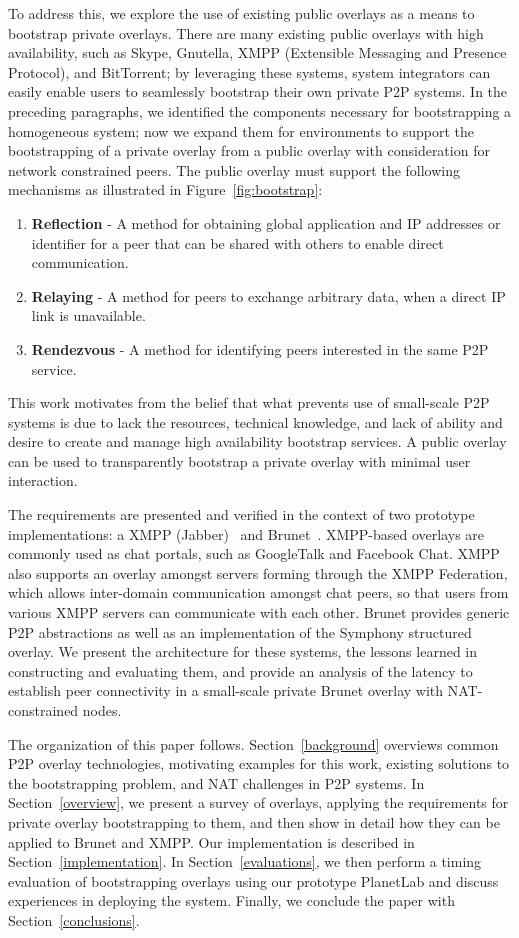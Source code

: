 \documentclass[conference]{IEEEtran}
\begin{document}
To address this, we explore the use of existing public overlays as a means to
bootstrap private overlays.  There are many existing public overlays with high
availability, such as Skype, Gnutella, XMPP (Extensible Messaging and Presence
Protocol), and BitTorrent; by leveraging these systems, system integrators can
easily enable users to seamlessly bootstrap their own private P2P systems.  In
the preceding paragraphs, we identified the components necessary for
bootstrapping a homogeneous system; now we expand them for environments to
support the bootstrapping of a private overlay from a public overlay with
consideration for network constrained peers.  The public overlay must support
the following mechanisms as illustrated in Figure~\ref{fig:bootstrap}:
\begin{enumerate}
\item \textbf{Reflection} - A method for obtaining global application and
IP addresses or identifier for a peer that can be shared with others to enable
direct communication.
\item \textbf{Relaying} - A method for peers to exchange arbitrary data, when
a direct IP link is unavailable.
\item \textbf{Rendezvous} - A method for identifying peers interested in the
same P2P service.
\end{enumerate}
This work motivates from the belief that what prevents use of small-scale P2P
systems is due to lack the resources, technical knowledge, and lack of ability
and desire to create and manage high availability bootstrap services.  A public
overlay can be used to transparently bootstrap a private overlay with minimal
user interaction.

The requirements are presented and verified in the context of two prototype
implementations: a XMPP (Jabber)~\cite{xmpp} and Brunet~\cite{brunet}.
XMPP-based overlays are commonly used as chat portals, such as GoogleTalk and
Facebook Chat.  XMPP also supports an overlay amongst servers forming through
the XMPP Federation, which allows inter-domain communication amongst chat
peers, so that users from various XMPP servers can communicate with each other.
Brunet provides generic P2P abstractions as well as an implementation of the
Symphony structured overlay.  We present the architecture for these systems,
the lessons learned in constructing and evaluating them, and provide an
analysis of the latency to establish peer connectivity in a small-scale private
Brunet overlay with NAT-constrained nodes.

The organization of this paper follows.  Section~\ref{background} overviews
common P2P overlay technologies, motivating examples for this work, existing
solutions to the bootstrapping problem, and NAT challenges in P2P systems.  In
Section~\ref{overview}, we present a survey of overlays, applying the
requirements for private overlay bootstrapping to them, and then show in detail
how they can be applied to Brunet and XMPP.  Our implementation is described in
Section~\ref{implementation}.  In Section~\ref{evaluations}, we then perform a
timing evaluation of bootstrapping overlays using our prototype PlanetLab and
discuss experiences in deploying the system.  Finally, we conclude the paper
with Section~\ref{conclusions}.
\end{document}
